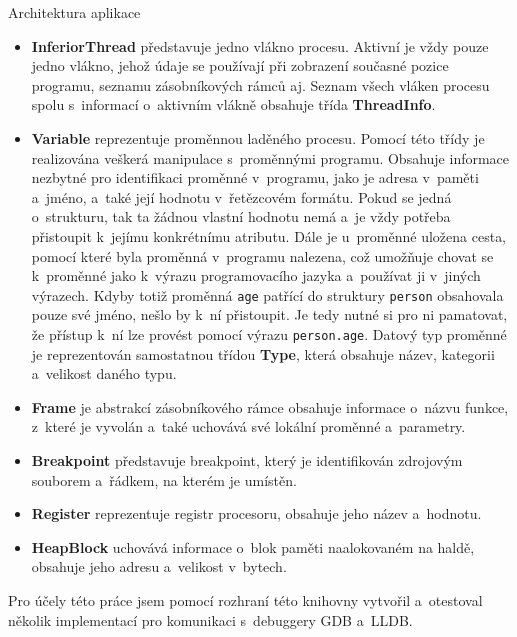 \documentclass[czech,bachelor,male,python,dept460,hidelinks]{diploma}						%
\begin{document}
\begin{section}{Architektura aplikace}
		\begin{itemize}
			\item \textbf{InferiorThread} představuje jedno vlákno procesu. Aktivní je vždy pouze jedno vlákno, jehož údaje se používají při zobrazení současné
			pozice programu, seznamu zásobníkových rámců aj. Seznam všech vláken procesu spolu s~informací o~aktivním vlákně obsahuje třída \textbf{ThreadInfo}.
			\item \textbf{Variable} reprezentuje proměnnou laděného procesu. Pomocí této třídy je realizována veškerá manipulace s~proměnnými programu.
			Obsahuje informace nezbytné pro identifikaci proměnné v~programu, jako je adresa v~paměti a~jméno, a~také její hodnotu v~řetězcovém formátu.
			Pokud se jedná o~strukturu, tak ta žádnou vlastní hodnotu nemá a~je vždy potřeba přistoupit k~jejímu konkrétnímu atributu.
			Dále je u~proměnné uložena cesta, pomocí které byla proměnná v~programu nalezena, což umožňuje chovat se k~proměnné
			jako k~výrazu programovacího jazyka a~používat ji v~jiných výrazech. Kdyby totiž proměnná \texttt{age} patřící do struktury \texttt{person} obsahovala
			pouze své jméno, nešlo by k~ní přistoupit. Je tedy nutné si pro ni pamatovat, že přístup k~ní lze provést pomocí výrazu \texttt{person.age}.
			Datový typ proměnné je reprezentován samostatnou třídou \textbf{Type}, která obsahuje název, kategorii a~velikost daného typu.
			\item \textbf{Frame} je abstrakcí zásobníkového rámce obsahuje informace o~názvu funkce, z~které je vyvolán a~také uchovává své lokální proměnné a~parametry.
			\item \textbf{Breakpoint} představuje breakpoint, který je identifikován zdrojovým souborem a~řádkem, na kterém je umístěn.
			\item \textbf{Register} reprezentuje registr procesoru, obsahuje jeho název a~hodnotu.
			\item \textbf{HeapBlock} uchovává informace o~blok paměti naalokovaném na haldě, obsahuje jeho adresu a~velikost v~bytech.
		\end{itemize}
		
		Pro účely této práce jsem pomocí rozhraní této knihovny vytvořil a~otestoval několik implementací pro komunikaci s~debuggery GDB a~LLDB.


\end{section}
\end{document}
